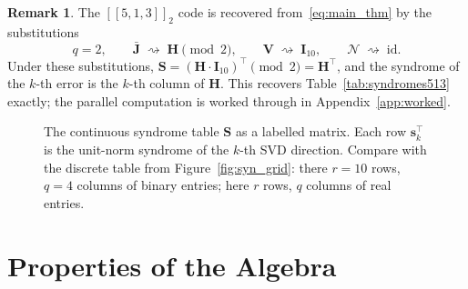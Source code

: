 \documentclass[11pt,a4paper]{article}
\theoremstyle{definition}
\newtheorem{remark}[theorem]{Remark}
\newcommand{\Vm}{\mathbf{V}}
\newcommand{\Sm}{\mathbf{S}}
\newcommand{\Jm}{\mathbf{J}}
\newcommand{\Hm}{\mathbf{H}}
\newcommand{\Imat}{\mathbf{I}}
\newcommand{\vk}[1][]{\mathbf{v}_{#1}}
\newcommand{\sk}[1][]{\mathbf{s}_{#1}}
\newcommand{\Nop}{\mathcal{N}}
\begin{document}
\begin{remark}
\label{rmk:513_special}
The $[\![5,1,3]\!]_2$ code is recovered from~\eqref{eq:main_thm} by the substitutions
\[
  q = 2, \qquad \bar{\Jm} \;\rightsquigarrow\; \Hm \pmod 2,
  \qquad \Vm \;\rightsquigarrow\; \Imat_{10},
  \qquad \Nop \;\rightsquigarrow\; \mathrm{id}.
\]
Under these substitutions, $\Sm = (\Hm \cdot \Imat_{10})^\top \pmod 2 = \Hm^\top$, and the syndrome of the $k$-th error is the $k$-th column of $\Hm$. This recovers Table~\ref{tab:syndromes513} exactly; the parallel computation is worked through in Appendix~\ref{app:worked}.
\end{remark}

\begin{figure}[h]
\centering
{}
\caption{The continuous syndrome table $\Sm$ as a labelled matrix. Each row $\sk[k]^\top$ is the unit-norm syndrome of the $k$-th SVD direction. Compare with the discrete table from Figure~\ref{fig:syn_grid}: there $r=10$ rows, $q=4$ columns of binary entries; here $r$ rows, $q$ columns of real entries.}
\label{fig:syn_table}
\end{figure}

\section{Properties of the Algebra}
\label{sec:properties}
\end{document}
